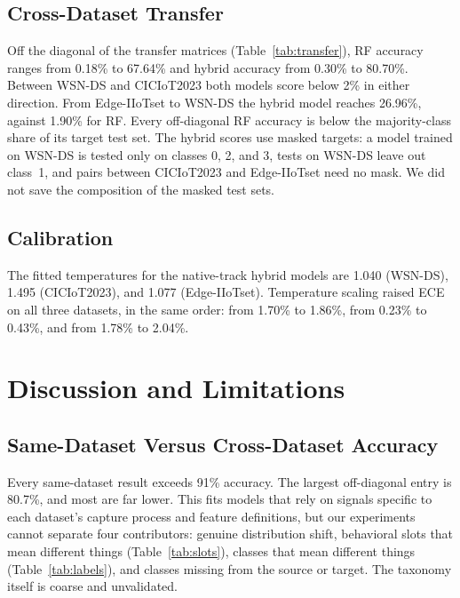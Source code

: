 \documentclass[conference]{IEEEtran}
\begin{document}
\subsection{Cross-Dataset Transfer}
Off the diagonal of the transfer matrices (Table~\ref{tab:transfer}), RF accuracy ranges from 0.18\% to 67.64\% and hybrid accuracy from 0.30\% to 80.70\%. Between WSN-DS and CICIoT2023 both models score below 2\% in either direction. From Edge-IIoTset to WSN-DS the hybrid model reaches 26.96\%, against 1.90\% for RF. Every off-diagonal RF accuracy is below the majority-class share of its target test set. The hybrid scores use masked targets: a model trained on WSN-DS is tested only on classes 0, 2, and 3, tests on WSN-DS leave out class~1, and pairs between CICIoT2023 and Edge-IIoTset need no mask. We did not save the composition of the masked test sets.

\subsection{Calibration}
The fitted temperatures for the native-track hybrid models are 1.040 (WSN-DS), 1.495 (CICIoT2023), and 1.077 (Edge-IIoTset). Temperature scaling raised ECE on all three datasets, in the same order: from 1.70\% to 1.86\%, from 0.23\% to 0.43\%, and from 1.78\% to 2.04\%.

\section{Discussion and Limitations}\label{sec:discussion}
\subsection{Same-Dataset Versus Cross-Dataset Accuracy}
Every same-dataset result exceeds 91\% accuracy. The largest off-diagonal entry is 80.7\%, and most are far lower. This fits models that rely on signals specific to each dataset's capture process and feature definitions, but our experiments cannot separate four contributors: genuine distribution shift, behavioral slots that mean different things (Table~\ref{tab:slots}), classes that mean different things (Table~\ref{tab:labels}), and classes missing from the source or target. The taxonomy itself is coarse and unvalidated.
\end{document}
